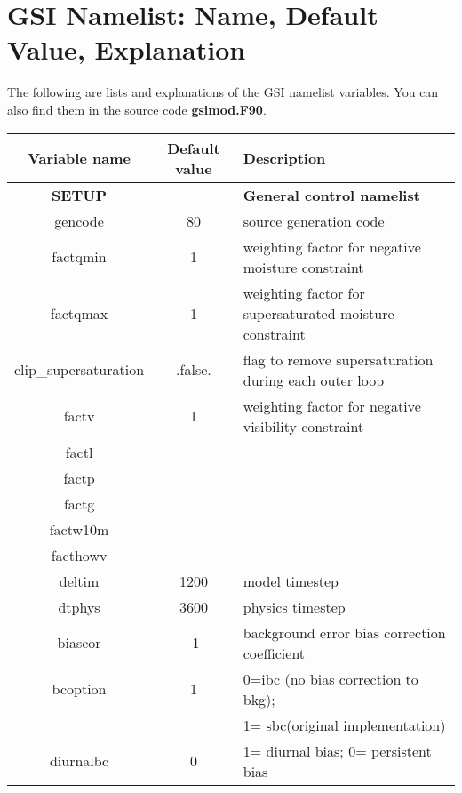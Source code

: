 \chapter{GSI Namelist: Name, Default Value, Explanation}\label{gsi_namelist}
The following are lists and explanations of the GSI namelist variables. You can also find them in the source code \textbf{gsimod.F90}. 

\begin{table}[h]
\footnotesize
 \center
  \begin{tabular}{| c | c | p{9cm} |}
  \hline
  Variable name & Default value & Description \\
  \hline
  \textbf{SETUP} &   & \textbf{General control namelist} \\
  \hline
  gencode & 80 & source generation code \\
  \hline
  factqmin & 1 & weighting factor for negative moisture constraint \\
  \hline
  factqmax & 1 & weighting factor for supersaturated moisture constraint \\
  \hline
  clip\_supersaturation	& .false. & flag to remove supersaturation during each outer loop \\
  \hline 
  factv & 1 & weighting factor for negative visibility constraint \\
  \hline
  factl & &  \\
  \hline
  factp & &  \\
  \hline
  factg & &  \\
  \hline
  factw10m & &  \\
  \hline
  facthowv & & \\
  \hline
  deltim & 1200 & model timestep \\
  \hline
  dtphys & 3600 & physics timestep \\
  \hline
  biascor & -1 & background error bias correction coefficient \\
  \hline
  bcoption & 1 & 0=ibc (no bias correction to bkg); \\
               & & 1= sbc(original implementation) \\
  \hline
  diurnalbc	& 0 & 1= diurnal bias; 0= persistent bias \\
  \hline
    \end{tabular}
\end{table}

